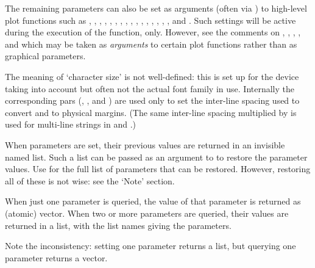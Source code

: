 \begin{Details}
\begin{itemize}
\end{itemize}

The remaining parameters can also be set as arguments (often via
) to high-level plot functions such as
, ,
, , ,
, , ,
, , ,
, , ,
, , 
and .  Such settings will be active during the
execution of the function, only.  However, see the comments on
, , , ,  and
 which may be taken as \emph{arguments} to certain plot
functions rather than as graphical parameters.

The meaning of `character size' is not well-defined: this is
set up for the device taking  into account but often
not the actual font family in use.  Internally the corresponding pars
(, ,  and ) are used only to
set the inter-line spacing used to convert  and 
to physical margins.  (The same inter-line spacing multiplied by
 is used for multi-line strings in  and
.)
\end{Details}
%
\begin{Value}
When parameters are set, their previous values are returned in an
invisible named list.  Such a list can be passed as an argument to
 to restore the parameter values.  Use  for the full list of parameters that can be restored.
However, restoring all of these is not wise: see the `Note'
section.

When just one parameter is queried, the value of that parameter
is returned as (atomic) vector.  When two or more parameters are
queried, their values are returned in a list, with the list names
giving the parameters.

Note the inconsistency: setting one parameter returns a list, but
querying one parameter returns a vector.
\end{Value}
%
